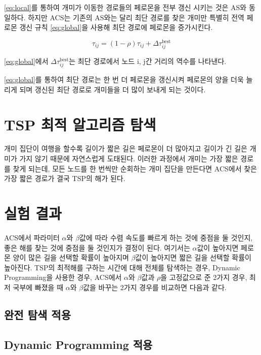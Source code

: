 \documentclass{kcc}
\begin{document}
\eqref{eq:local}를 통하여 개미가 이동한 경로들의 페로몬을 전부 갱신 시키는 것은 AS와 동일하다. 
하지만 ACS는 기존의 AS와는 달리 최단 경로를 찾은 개미만 특별히 전역 페로몬 갱신 규칙 \eqref{eq:global}을 사용해 최단 경로에 페로몬을 증가시킨다.

\begin{equation} \label{eq:global} \tag{3}
	\tau_{ij} = (1 - \rho) \tau_{ij} + \Delta \tau_{ij}^{\text{best}}
\end{equation}

\eqref{eq:global}에서  $\Delta \tau_{ij}^{\text{best}}$는 최단 경로에서 노드 i, j간 거리의 역수를 나타낸다.

\eqref{eq:global}를 통하여 최단 경로는 한 번 더 페로몬을 갱신시켜 페로몬의 양을 더욱 늘리게 되며 갱신된 최단 경로로 개미들을 더 많이 보내게 되는 것이다.

\section{TSP 최적 알고리즘 탐색}
 개미 집단이 여행을 할수록 길이가 짧은 길은 페로몬이 더 많아지고 길이가 긴 길은 개미가 가지 않기 때문에 자연스럽게 도태된다. 이러한 과정에서 개미는 가장 짧은 경로를 찾게 되는데, 모든 노드를 한 번씩만 순회하는 개미 집단을 만든다면 ACS에서 찾은 가장 짧은 경로가 결국 TSP의 해가 된다.

\section{실험 결과}

 ACS에서 파라미터 $\alpha$와 $\beta$값에 따라 수렴 속도를 빠르게 하는 것에 중점을 둘 것인지, 좋은 해를 찾는 것에 중점을 둘 것인지가 결정이 된다. 여기서는 $\alpha$값이 높아지면 페로몬 양이 많은 길을 선택할 확률이 높아지며 $\beta$값이 높아지면 짧은 길을 선택할 확률이 높아진다. TSP의 최적해를 구하는 시간에 대해 전체를 탐색하는 경우, Dynamic Programming을 사용한 경우, ACS에서 $\alpha$와 $\beta$값과 $\rho$을 고정값으로 준 2가지 경우, 최저 국부에 빠졌을 때 $\alpha$와 $\beta$값을 바꾸는 2가지 경우를 비교하면 다음과 같다.

\subsection{완전 탐색 적용}

\subsection{Dynamic Programming 적용}
\end{document}
